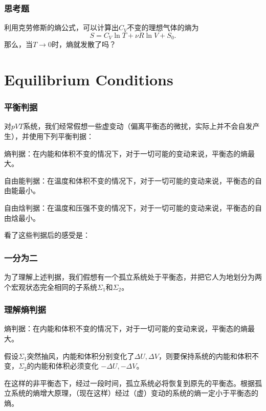 \documentclass[CJK,13pt]{beamer}
\begin{document}
\begin{frame}
  \frametitle{思考题}
  
  利用克劳修斯的熵公式，可以计算出$C_V$不变的理想气体的熵为
  $$S = C_V\ln T + \nu R \ln V + S_0 .$$
  那么，当$T\rightarrow 0$时，熵就发散了吗？
\end{frame}



\section{Equilibrium Conditions}


\begin{frame}
\frametitle{平衡判据}

对$pVT$系统，我们经常假想一些虚变动（偏离平衡态的微扰，实际上并不会自发产生），并使用下列平衡判据：
\bitem
\item{\blue 熵判据：在内能和体积不变的情况下，对于一切可能的变动来说，平衡态的熵最大。}
\item{\blue 自由能判据：在温度和体积不变的情况下，对于一切可能的变动来说，平衡态的自由能最小。}
\item{\blue 自由焓判据：在温度和压强不变的情况下，对于一切可能的变动来说，平衡态的自由焓最小。}
\eitem
\end{frame}


\begin{frame}

  看了这些判据后的感受是：

  \skipline


\end{frame}




\begin{frame}
\frametitle{一分为二}
为了理解上述判据，我们假想有一个孤立系统处于平衡态，并把它人为地划分为两个宏观状态完全相同的子系统$\Sigma_1$和$\Sigma_2$。



\end{frame}


\begin{frame}
\frametitle{理解熵判据}
 {\blue 熵判据：在内能和体积不变的情况下，对于一切可能的变动来说，平衡态的熵最大。}


 假设$\Sigma_1$突然抽风，内能和体积分别变化了$\Delta U, \Delta V$，则要保持系统的内能和体积不变，$\Sigma_2$的内能和体积必须变化
 $-\Delta U, -\Delta V$。


 在这样的非平衡态下，经过一段时间，孤立系统必将恢复到原先的平衡态。根据孤立系统的熵增大原理，（现在这样）经过（虚）变动的系统的熵一定小于平衡态的熵。

\end{frame}
\end{document}
